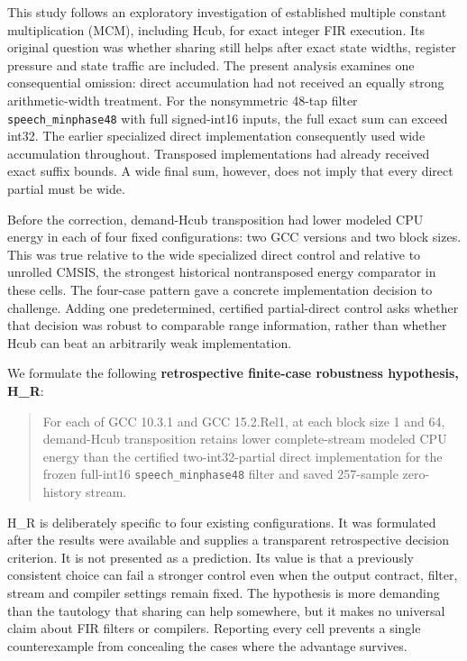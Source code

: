 \documentclass[conference]{IEEEtran}
\begin{document}
This study follows an exploratory investigation of established multiple
constant multiplication (MCM), including Hcub, for exact integer FIR
execution. Its original question was whether sharing still helps after
exact state widths, register pressure and state traffic are included.
The present analysis examines one consequential omission: direct
accumulation had not received an equally strong arithmetic-width
treatment. For the nonsymmetric 48-tap filter
\texttt{speech\_minphase48} with full signed-int16 inputs, the full
exact sum can exceed int32. The earlier specialized direct
implementation consequently used wide accumulation throughout.
Transposed implementations had already received exact suffix bounds. A
wide final sum, however, does not imply that every direct partial must
be wide.

Before the correction, demand-Hcub transposition had lower modeled CPU
energy in each of four fixed configurations: two GCC versions and two
block sizes. This was true relative to the wide specialized direct
control and relative to unrolled CMSIS, the strongest historical
nontransposed energy comparator in these cells. The four-case pattern
gave a concrete implementation decision to challenge. Adding one
predetermined, certified partial-direct control asks whether that
decision was robust to comparable range information, rather than whether
Hcub can beat an arbitrarily weak implementation.

We formulate the following \textbf{retrospective finite-case robustness
hypothesis, H\_R}:

\begin{quote}
For each of GCC 10.3.1 and GCC 15.2.Rel1, at each block size 1 and 64,
demand-Hcub transposition retains lower complete-stream modeled CPU
energy than the certified two-int32-partial direct implementation for
the frozen full-int16 \texttt{speech\_minphase48} filter and saved
257-sample zero-history stream.
\end{quote}

H\_R is deliberately specific to four existing configurations. It was
formulated after the results were available and supplies a transparent
retrospective decision criterion. It is not presented as a prediction.
Its value is that a previously consistent choice can fail a stronger
control even when the output contract, filter, stream and compiler
settings remain fixed. The hypothesis is more demanding than the
tautology that sharing can help somewhere, but it makes no universal
claim about FIR filters or compilers. Reporting every cell prevents a
single counterexample from concealing the cases where the advantage
survives.
\end{document}
